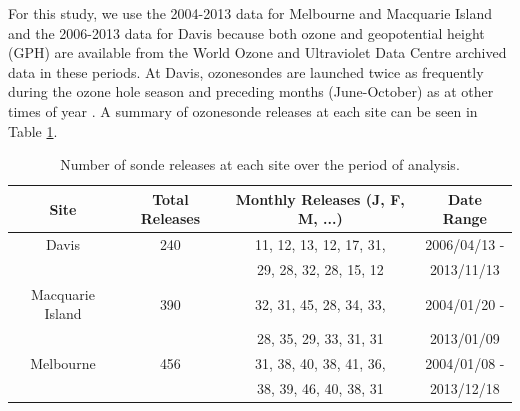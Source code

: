 \documentclass[acp, manuscript]{copernicus} %
\begin{document}
    For this study, we use the 2004-2013 data for Melbourne and Macquarie Island and the 2006-2013 data for Davis because both ozone and geopotential height (GPH) are available from the World Ozone and Ultraviolet Data Centre archived data in these periods.
    At Davis, ozonesondes are launched twice as frequently during the ozone hole season and preceding months (June-October) as at other times of year \citep{Alexander2013}.
    A summary of ozonesonde releases at each site can be seen in Table \ref{table:sondesummary}.

    \begin{table}[t]
      \caption{Number of sonde releases at each site over the period of analysis.}
      \begin{tabular}{ c   c   c   c  } 
	\hline
	Site 		 & Total Releases & Monthly Releases (J, F, M, ...) & Date Range \\
	\hline
	Davis		 & 240	& 11, 12, 13, 12, 17, 31,	& 2006/04/13 -  \\ 
			 &	& 29, 28, 32, 28, 15, 12 	& 2013/11/13	\\
	Macquarie Island & 390	& 32, 31, 45, 28, 34, 33,	& 2004/01/20 -  \\
			 &	& 28, 35, 29, 33, 31, 31 	& 2013/01/09	\\ 
	Melbourne 	 & 456	& 31, 38, 40, 38, 41, 36,	& 2004/01/08 -  \\
			 &	& 38, 39, 46, 40, 38, 31 	& 2013/12/18	\\
	\hline
      \end{tabular}
      \label{table:sondesummary}
    \end{table}
\end{document}
